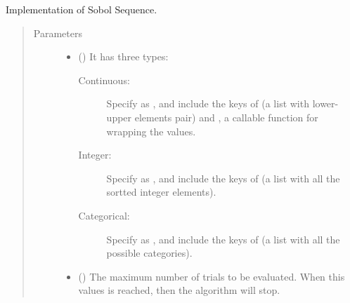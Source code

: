 \documentclass[letterpaper,10pt,english]{sphinxmanual}
\begin{document}
\begin{fulllineitems}
\label{\detokenize{apidoc:pybatdoe.batch_sobol.SobolSearch}}
Implementation of Sobol Sequence.
\begin{quote}\begin{description}
\item[{Parameters}] \leavevmode\begin{itemize}
\item {} 
 () \textendash{} 
It has three types:
\begin{description}
\item[{Continuous: }] \leavevmode
Specify  as , and include the keys of  (a list with lower-upper elements pair) and
, a callable function for wrapping the values.

\item[{Integer:}] \leavevmode
Specify  as , and include the keys of  (a list with all the sortted integer elements).

\item[{Categorical:}] \leavevmode
Specify  as , and include the keys of  (a list with all the possible categories).

\end{description}


\item {} 
 (\sphinxstyleliteralemphasis{\sphinxupquote{, }}\sphinxstyleliteralemphasis{\sphinxupquote{, }}) \textendash{} The maximum number of trials to be evaluated. When this values is reached, 
then the algorithm will stop.


\end{itemize}
\end{description}
\end{quote}
\end{fulllineitems}
\end{document}
